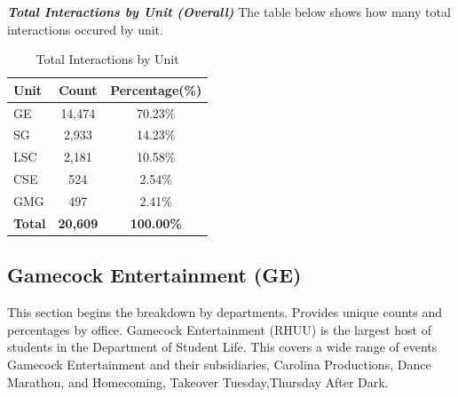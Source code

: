 \documentclass[
  letterpaper,
  DIV=11,
  numbers=noendperiod]{scrartcl}
\begin{document}
\newpage
\raggedright

\textsf{\textbf{\textit{Total Interactions by Unit (Overall)}}}
\noindent The table below shows how many total interactions occured by
unit.

\begin{longtable}[t]{lcc}
\caption{Total Interactions by Unit}\tabularnewline

\toprule
\textbf{Unit} & \textbf{Count} & \textbf{Percentage(\%)}\\
\midrule
GE & 14,474 & 70.23\%\\
SG & 2,933 & 14.23\%\\
LSC & 2,181 & 10.58\%\\
CSE & 524 & 2.54\%\\
GMG & 497 & 2.41\%\\
\midrule
\addlinespace
\textbf{Total} & \textbf{20,609} & \textbf{100.00\%}\\
\bottomrule
\end{longtable}

\FloatBarrier

\newpage

\subsection{Gamecock Entertainment
(GE)}\label{gamecock-entertainment-ge}

This section begins the breakdown by departments. Provides unique counts
and percentages by office. Gamecock Entertainment (RHUU) is the largest
host of students in the Department of Student Life. This covers a wide
range of events Gamecock Entertainment and their subsidiaries, Carolina
Productions, Dance Marathon, and Homecoming, Takeover Tuesday,Thursday
After Dark.
\end{document}
